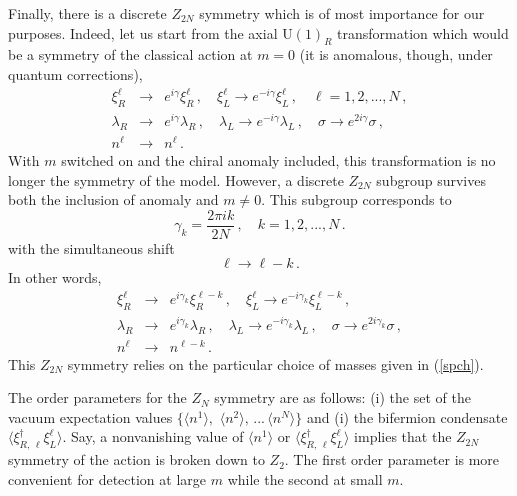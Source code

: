 \documentclass[epsfig,12pt]{article}
\def\beq{\begin{equation}}
\def\eeq{\end{equation}}
\def\beqn{\begin{eqnarray}}
\def\eeqn{\end{eqnarray}}
\def\beqn{\begin{eqnarray}}
\def\eeqn{\end{eqnarray}}
\def\beq{\begin{equation}}
\def\eeq{\end{equation}}
\begin{document}
Finally, there is a discrete $Z_{2N}$ symmetry which is of most importance for our purposes.
Indeed, let us start from the axial U$(1)_R$ transformation which would be a symmetry
of the classical action at $m=0$ 
 (it is anomalous, though, under quantum corrections),
\beqn
\xi^\ell_R 
&\to& 
e^{i\gamma}\xi^\ell_R\,, \quad
 \xi^\ell_L \to e^{-i\gamma }\xi^\ell_L\,,\quad \ell=1,2, ..., N\,,
 \nonumber\\[2mm]
 \lambda_R 
&\to&
 e^{i\gamma}\lambda_R\,,\quad 
 \lambda_L \to e^{-i\gamma}\lambda_L\,,\quad \sigma \to e^{2i\gamma}\sigma\,,
\nonumber\\[2mm]
n^\ell
&\to&
 n^\ell\,.
\eeqn
With $m$ switched on and the chiral anomaly included, this transformation 
is no longer the symmetry of the model. However, a discrete $Z_{2N}$ subgroup survives both the inclusion of anomaly and $m\neq 0$. This subgroup corresponds to
\beq
\gamma_k =\frac{2\pi i k}{2N}\,,\quad k= 1,2, ..., N\,.
\eeq
with the simultaneous shift
\beq
\ell\to \ell - k\,.
\eeq
In other words,
\beqn
\xi^\ell_R 
&\to& 
e^{i\gamma_k}\xi^{\ell-k}_R\,, \quad
 \xi^\ell_L \to e^{-i\gamma_k }\xi^{\ell-k}_L\,, 
 \nonumber\\[2mm]
 \lambda_R 
&\to&
 e^{i\gamma_k}\lambda_R\,,\quad 
 \lambda_L \to e^{-i\gamma_k}\lambda_L\,,\quad \sigma \to e^{2i\gamma_k}\sigma\,,
 \nonumber\\[2mm]
 n^\ell &\to & n^{\ell-k}\,.
 \label{bee35}
\eeqn
This $Z_{2N}$ symmetry  relies on the particular choice of masses 
given in (\ref{spch}).

The order parameters for the $Z_N$ symmetry are as follows:
(i) the set of the vacuum expectation values
$\{ \langle n^1\rangle,\,\, \langle n^2\rangle, \,...\, \langle n^N\rangle\}$
and (i) the bifermion condensate $\langle  \xi^\dagger_{R,\,\ell}\xi^\ell_L\rangle$.
Say, a nonvanishing value of $\langle n^1\rangle$ or  $\langle  \xi^\dagger_{R,\,\ell}\xi^\ell_L\rangle$ implies that the $Z_{2N}$ symmetry of the action is broken down to
$Z_2$. The first order parameter is more convenient for detection
at large $m$ while the second at small $m$. 
\end{document}
